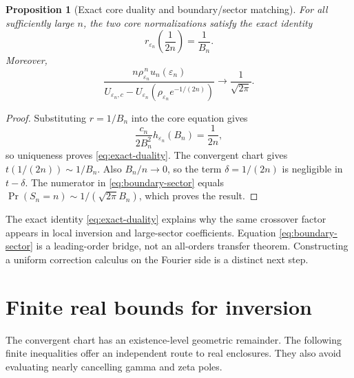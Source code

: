 \documentclass[11pt,a4paper]{article}
\numberwithin{equation}{section}
\newtheorem{proposition}[theorem]{Proposition}
\theoremstyle{definition}
\theoremstyle{remark}
\newcommand{\eps}{\varepsilon}
\begin{document}
\begin{proposition}[Exact core duality and boundary/sector matching]
\label{prop:duality}
For all sufficiently large \(n\), the two core normalizations satisfy the
exact identity
\begin{equation}
 r_{\eps_n}\left(\frac1{2n}\right)=\frac1{B_n}.
 \label{eq:exact-duality}
\end{equation}
Moreover,
\begin{equation}
 \frac{n\rho_{\eps_n}^{\,n}u_n(\eps_n)}
 {U_{\eps_n,c}-U_{\eps_n}(\rho_{\eps_n}e^{-1/(2n)})}
 \longrightarrow\frac1{\sqrt{2\pi}}.
 \label{eq:boundary-sector}
\end{equation}
\end{proposition}
\begin{proof}
Substituting \(r=1/B_n\) into the core equation gives
\[
 \frac{c_n}{2B_n^2}h_{\eps_n}(B_n)=\frac1{2n},
\]
so uniqueness proves \eqref{eq:exact-duality}. The convergent chart gives
\(t(1/(2n))\sim1/B_n\). Also \(B_n/n\to0\), so the term \(\delta=1/(2n)\)
is negligible in \(t-\delta\). The numerator in
\eqref{eq:boundary-sector} equals \(\Pr(S_n=n)\sim1/(\sqrt{2\pi}B_n)\),
which proves the result.
\end{proof}

The exact identity \eqref{eq:exact-duality} explains why the same crossover
factor appears in local inversion and large-sector coefficients. Equation
\eqref{eq:boundary-sector} is a leading-order bridge, not an all-orders
transfer theorem. Constructing a uniform correction calculus on the Fourier
side is a distinct next step.

\section{Finite real bounds for inversion}
\label{sec:certificates}
The convergent chart has an existence-level geometric remainder. The
following finite inequalities offer an independent route to real enclosures.
They also avoid evaluating nearly cancelling gamma and zeta poles.
\end{document}
